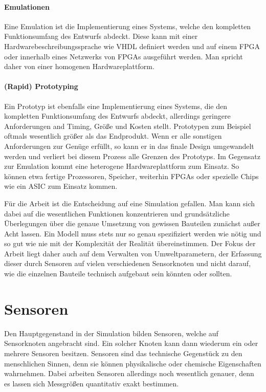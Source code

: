 \paragraph{Emulationen}

Eine Emulation ist die Implementierung eines Systems, welche den kompletten Funktionsumfang des Entwurfs abdeckt. Diese kann mit einer Hardwarebeschreibungssprache wie VHDL definiert werden und auf einem FPGA oder innerhalb eines Netzwerks von FPGAs ausgeführt werden. Man spricht daher von einer homogenen Hardwareplattform.

\paragraph{(Rapid) Prototyping}

Ein Prototyp ist ebenfalls eine Implementierung eines Systems, die den kompletten Funktionsumfang des Entwurfs abdeckt, allerdings geringere Anforderungen and Timing, Größe und Kosten stellt. Prototypen zum Beispiel oftmals wesentlich größer als das Endprodukt. Wenn er alle sonstigen Anforderungen zur Genüge erfüllt, so kann er in das finale Design umgewandelt werden und verliert bei diesem Prozess alle Grenzen des Prototyps. Im Gegensatz zur Emulation kommt eine heterogene Hardwareplattform zum Einsatz. So können etwa fertige Prozessoren, Speicher, weiterhin FPGAs oder spezielle Chips wie ein ASIC zum Einsatz kommen.

\endgraf

Für die Arbeit ist die Entscheidung auf eine Simulation gefallen. Man kann sich dabei auf die wesentlichen Funktionen konzentrieren und grundsätzliche Überlegungen über die genaue Umsetzung von gewissen Bauteilen zunächst außer Acht lassen. Ein Modell muss stets nur so genau spezifiziert werden wie nötig und so gut wie nie mit der Komplexität der Realität übereinstimmen. \newline
Der Fokus der Arbeit liegt daher auch auf dem Verwalten von Umweltparametern, der Erfassung dieser durch Sensoren auf vielen verschiedenen Sensorknoten und nicht darauf, wie die einzelnen Bauteile technisch aufgebaut sein könnten oder sollten. 

\section{Sensoren}

Den Hauptgegenstand in der Simulation bilden Sensoren, welche auf Sensorknoten angebracht sind. Ein solcher Knoten kann dann wiederum ein oder mehrere Sensoren besitzen.\newline
Sensoren sind das technische Gegenstück zu den menschlichen Sinnen, denn sie können physikalische oder chemische Eigenschaften wahrnehmen. Dabei arbeiten Sensoren allerdings noch wesentlich genauer, denn es lassen sich Messgrößen quantitativ exakt bestimmen.\newline

